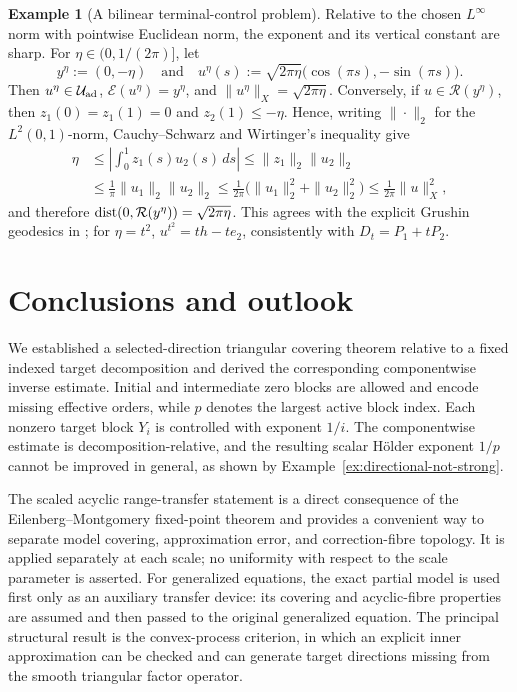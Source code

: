 \documentclass[11pt]{amsart}
\theoremstyle{definition}
\newtheorem{example}[theorem]{Example}
\theoremstyle{remark}
\newcommand{\dist}{\mathop{\rm dist}\nolimits}
\begin{document}
\begin{example}[A bilinear terminal-control problem]
		Relative to the chosen $L^\infty$ norm with pointwise Euclidean norm,
		the exponent and its vertical constant are sharp. For
		$\eta\in(0,1/(2\pi)]$, let
		$$
		y^\eta:=(0,-\eta)
		\quad\text{and}\quad
		u^\eta(s):=\sqrt{2\pi\eta}
		\bigl(\cos(\pi s),-\sin(\pi s)\bigr).
		$$
		Then $u^\eta\in\mathcal U_{\rm ad}$,
		$\mathcal E(u^\eta)=y^\eta$, and
		$\|u^\eta\|_X=\sqrt{2\pi\eta}$.
		Conversely, if $u\in\mathcal R(y^\eta)$, then
		$z_1(0)=z_1(1)=0$ and $z_2(1)\le-\eta$.  Hence, writing
		$\|\cdot\|_2$ for the $L^2(0,1)$-norm, Cauchy--Schwarz and
		Wirtinger's inequality give
		$$
		\begin{aligned}
			\eta&\le
			\left|\int_0^1z_1(s)u_2(s)\,ds\right|
			\le\|z_1\|_2\|u_2\|_2\\
			&\le
			\frac1\pi\|u_1\|_2\|u_2\|_2
			\le
			\frac1{2\pi}\bigl(\|u_1\|_2^2+\|u_2\|_2^2\bigr)
			\le
			\frac1{2\pi}\|u\|_X^2,
		\end{aligned}
		$$
		and therefore
		$\dist(0,\mathcal R(y^\eta))=\sqrt{2\pi\eta}$.
		This agrees with the explicit Grushin geodesics in
		\cite[Section~9]{AgrachevLeeGrushin}; for $\eta=t^2$,
		$u^{t^2}=th-te_2$, consistently with $D_t=P_1+tP_2$.
	\end{example}
	
	
	
	\section{Conclusions and outlook}
	\label{sec:conclusion}
	
	We established a selected-direction triangular covering theorem relative
	to a fixed indexed target decomposition and derived the corresponding
	componentwise inverse estimate.  Initial and intermediate zero blocks are
	allowed and encode missing effective orders, while $p$ denotes the
	largest active block index.  Each nonzero target block $Y_i$ is controlled
	with exponent $1/i$.  The componentwise estimate is
	decomposition-relative, and the resulting scalar H\"older exponent $1/p$
	cannot be improved in general, as shown by
	Example~\ref{ex:directional-not-strong}.
	
	The scaled acyclic range-transfer statement is a direct consequence of
	the Eilenberg--Montgomery fixed-point theorem and provides a convenient
	way to separate model covering, approximation error, and correction-fibre
	topology. It is applied separately at each scale; no uniformity with
	respect to the scale parameter is asserted. For generalized equations,
	the exact partial model is used first only as an auxiliary transfer device:
	its covering and acyclic-fibre properties are assumed and then passed to
	the original generalized equation. The principal structural result is the
	convex-process criterion, in which an explicit inner approximation can be
	checked and can generate target directions missing from the smooth
	triangular factor operator.
	
\end{document}
